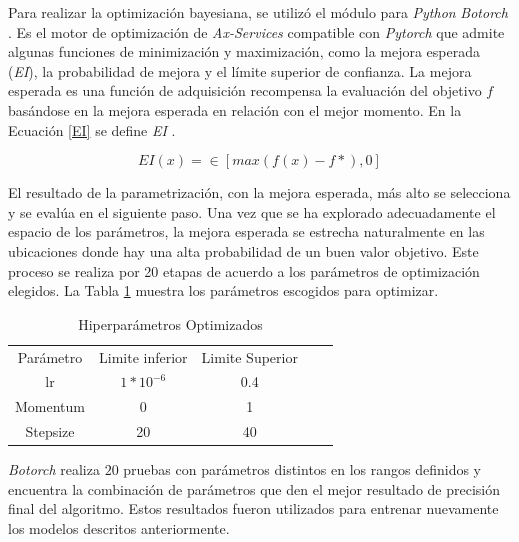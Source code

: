 	Para realizar la optimización bayesiana, se utilizó el módulo para \textit{Python} \textit{Botorch}  \cite{balandat2020botorch}. Es el motor de optimización de \textit{Ax-Services} compatible con \textit{Pytorch} que admite algunas funciones de minimización y maximización, como la mejora esperada (\textit{EI}), la probabilidad de mejora y el límite superior de confianza. La mejora esperada es una función de adquisición recompensa la evaluación del objetivo $f$ basándose en la mejora esperada en relación con el mejor momento. En la Ecuación \ref{EI} se define  \textit{EI} .
	
	\begin{equation}
		{EI(x)=\in[max(f(x)-f*),0]}
		\label{EI}
	\end{equation}
	
	El resultado de la parametrización, con la mejora esperada, más alto se selecciona y se evalúa en el siguiente paso. Una vez que se ha explorado adecuadamente el espacio de los parámetros, la mejora esperada se estrecha naturalmente en las ubicaciones donde hay una alta probabilidad de un buen valor objetivo. Este proceso se realiza por 20 etapas de acuerdo a los parámetros de optimización elegidos. La Tabla \ref{paraopt} muestra los parámetros escogidos para optimizar.
	
	\begin{table}[ht]
		\centering
		\begin{tabular}{|c|c|c|ll}
			\cline{1-3}
			Parámetro & Limite inferior              & Limite Superior &  &  \\ \cline{1-3}
			lr         & $1*10^{-6}$ & 0.4             &  &  \\ \cline{1-3}
			Momentum   & 0                            & 1               &  &  \\ \cline{1-3}
			Stepsize   & 20                           & 40              &  &  \\ \cline{1-3}
		\end{tabular}
		\caption{Hiperparámetros Optimizados}
		\label{paraopt}
	\end{table}

	\textit{Botorch} realiza $20$ pruebas con parámetros distintos en los rangos definidos y encuentra la combinación de parámetros que den el mejor resultado de precisión final del algoritmo. Estos resultados fueron utilizados para entrenar nuevamente los modelos descritos anteriormente. 
	
	
	
	
	\newpage	
